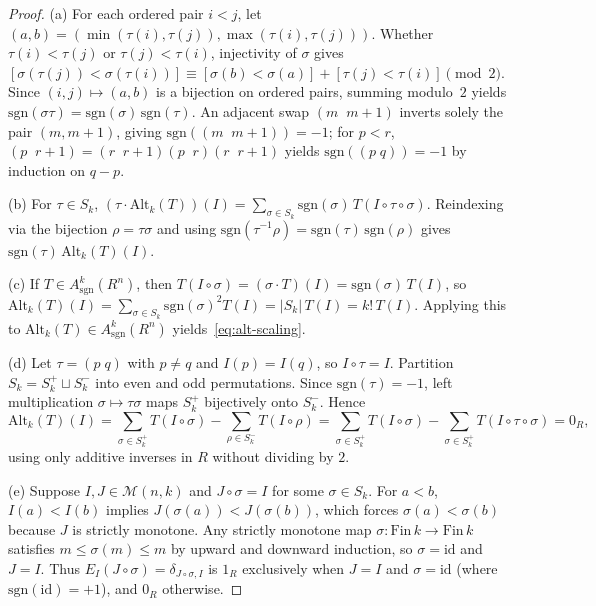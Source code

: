 \documentclass[11pt,a4paper]{article}
\theoremstyle{definition}
\theoremstyle{remark}
\newcommand{\Alt}{\mathrm{Alt}}
\newcommand{\sgn}{\mathrm{sgn}}
\newcommand{\id}{\mathrm{id}}
\begin{document}
\begin{proof}
(a) For each ordered pair $i < j$, let $(a, b) = (\min(\tau(i),\tau(j)), \max(\tau(i),\tau(j)))$. Whether $\tau(i) < \tau(j)$ or $\tau(j) < \tau(i)$, injectivity of $\sigma$ gives $[\sigma(\tau(j)) < \sigma(\tau(i))] \equiv [\sigma(b) < \sigma(a)] + [\tau(j) < \tau(i)] \pmod 2$. Since $(i, j) \mapsto (a, b)$ is a bijection on ordered pairs, summing modulo~$2$ yields $\sgn(\sigma\tau) = \sgn(\sigma)\,\sgn(\tau)$. An adjacent swap $(m\;\;m+1)$ inverts solely the pair $(m, m+1)$, giving $\sgn((m\;\;m+1)) = -1$; for $p < r$, $(p\;\;r+1) = (r\;\;r+1)(p\;\;r)(r\;\;r+1)$ yields $\sgn((p\;q)) = -1$ by induction on $q - p$.

(b) For $\tau \in S_k$, $(\tau \cdot \Alt_k(T))(I) = \sum_{\sigma \in S_k} \sgn(\sigma)\,T(I \circ \tau \circ \sigma)$. Reindexing via the bijection $\rho = \tau\sigma$ and using $\sgn(\tau^{-1}\rho) = \sgn(\tau)\,\sgn(\rho)$ gives $\sgn(\tau)\,\Alt_k(T)(I)$.

(c) If $T \in A^k_{\sgn}(R^n)$, then $T(I \circ \sigma) = (\sigma \cdot T)(I) = \sgn(\sigma)\,T(I)$, so $\Alt_k(T)(I) = \sum_{\sigma \in S_k} \sgn(\sigma)^2 T(I) = |S_k|\,T(I) = k!\,T(I)$. Applying this to $\Alt_k(T) \in A^k_{\sgn}(R^n)$ yields~\eqref{eq:alt-scaling}.

(d) Let $\tau = (p\;q)$ with $p \neq q$ and $I(p) = I(q)$, so $I \circ \tau = I$. Partition $S_k = S_k^+ \sqcup S_k^-$ into even and odd permutations. Since $\sgn(\tau) = -1$, left multiplication $\sigma \mapsto \tau\sigma$ maps $S_k^+$ bijectively onto $S_k^-$. Hence
\[
  \Alt_k(T)(I) = \sum_{\sigma \in S_k^+} T(I \circ \sigma) - \sum_{\rho \in S_k^-} T(I \circ \rho) = \sum_{\sigma \in S_k^+} T(I \circ \sigma) - \sum_{\sigma \in S_k^+} T(I \circ \tau \circ \sigma) = 0_R,
\]
using only additive inverses in $R$ without dividing by $2$.

(e) Suppose $I, J \in \mathcal{M}(n, k)$ and $J \circ \sigma = I$ for some $\sigma \in S_k$. For $a < b$, $I(a) < I(b)$ implies $J(\sigma(a)) < J(\sigma(b))$, which forces $\sigma(a) < \sigma(b)$ because $J$ is strictly monotone. Any strictly monotone map $\sigma : \mathrm{Fin}\,k \to \mathrm{Fin}\,k$ satisfies $m \le \sigma(m) \le m$ by upward and downward induction, so $\sigma = \id$ and $J = I$. Thus $E_I(J \circ \sigma) = \delta_{J \circ \sigma, I}$ is $1_R$ exclusively when $J = I$ and $\sigma = \id$ (where $\sgn(\id) = +1$), and $0_R$ otherwise.
\end{proof}
\end{document}
